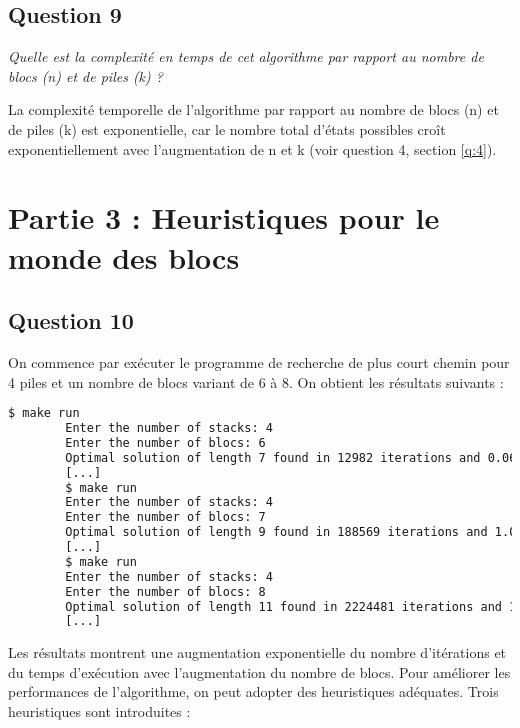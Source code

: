 \subsection{Question 9}

\textit{Quelle est la complexité en temps de cet algorithme par rapport au nombre de blocs (n) et de piles (k) ?}

La complexité temporelle de l'algorithme par rapport au nombre de blocs (n) et de piles (k) est exponentielle, car le nombre total d'états possibles croît exponentiellement avec l'augmentation de n et k (voir question 4, section \ref{q:4}).

\section{Partie 3 : Heuristiques pour le monde des blocs}

\subsection{Question 10}

On commence par exécuter le programme de recherche de plus court chemin pour 4 piles et un nombre de blocs variant de 6 à 8. On obtient les résultats suivants :

\begin{minipage}{\dimexpr\linewidth-20pt}
    \begin{lstlisting}[language=bash, caption={Résultats de l'exécution du programme de recherche de plus court chemin}, label={lst:plus_court_chemin_results_no_heuristics}]
        $ make run
        Enter the number of stacks: 4
        Enter the number of blocs: 6
        Optimal solution of length 7 found in 12982 iterations and 0.060902 seconds
        [...]
        $ make run
        Enter the number of stacks: 4
        Enter the number of blocs: 7
        Optimal solution of length 9 found in 188569 iterations and 1.04769 seconds
        [...]
        $ make run
        Enter the number of stacks: 4
        Enter the number of blocs: 8
        Optimal solution of length 11 found in 2224481 iterations and 15.6446 seconds
        [...]
    \end{lstlisting}
\end{minipage}

Les résultats montrent une augmentation exponentielle du nombre d'itérations et du temps d'exécution avec l'augmentation du nombre de blocs. Pour améliorer les performances de l'algorithme, on peut adopter des heuristiques adéquates. Trois heuristiques sont introduites :

